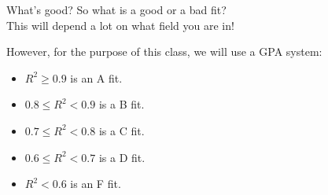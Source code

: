 \begin{frame}{What's good?}
    So what is a good or a bad fit? \\ This will depend a lot on what field you are in!
    
    \vspace{12pt}However, for the purpose of this class, we will use a GPA system:
    \begin{itemize}
        \item $R^2\ge0.9$ is an A fit.
        \item $0.8 \le R^2 < 0.9$ is a B fit.
        \item $0.7 \le R^2 < 0.8$ is a C fit.
        \item $0.6 \le R^2 < 0.7$ is a D fit.
        \item $R^2 < 0.6$ is an F fit.
    \end{itemize}
\end{frame}